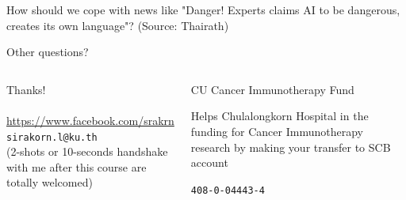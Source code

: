 \documentclass[aspectratio=169]{beamer}
\begin{document}
\begin{frame}
	\begin{center}
		{\Large How should we cope with news like "Danger! Experts claims AI to be dangerous, creates its own language"?}
		{\small (Source: Thairath)}
	\end{center}
\end{frame}

\begin{frame}
	\begin{center}
		{\huge Other questions?}
	\end{center}
\end{frame}

\begin{frame}
	\begin{columns}
		\begin{center}
			{\Huge Thanks!}
			\\~\\
			\url{https://www.facebook.com/srakrn}\\
			\texttt{sirakorn.l@ku.th}\\
			{\tiny (2-shots or 10-seconds handshake with me after this course are totally welcomed)}
		\end{center}
		\begin{block}{CU Cancer Immunotherapy Fund}
			{\small
				Helps Chulalongkorn Hospital in the funding for Cancer Immunotherapy research by making your transfer to SCB account\\
				\begin{center}
					\large{\texttt{408-0-04443-4}}
				\end{center}
			}
		\end{block}
	\end{columns}
\end{frame}
\end{document}
